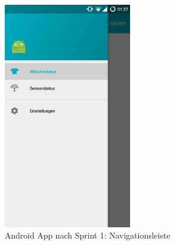 \begin{figure}[htb] 
	\centerline{\includegraphics[width=0.5\textwidth]{nav_drawer.png}}
	\caption{Android App nach Sprint 1: Navigationsleiste}
	\label{screenshot_sprint_1_navigation_drawer}
\end{figure}
\clearpage

